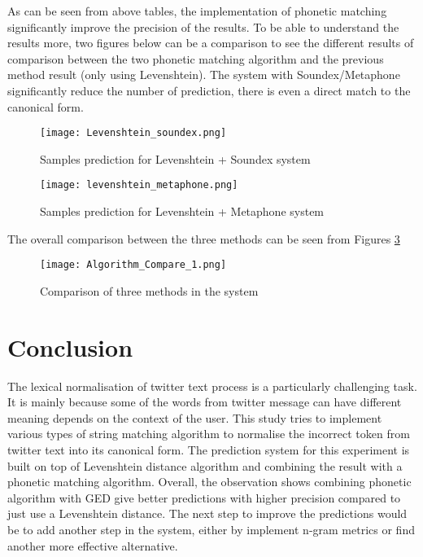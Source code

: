 \documentclass[11pt]{article}
\begin{document}
As can be seen from above tables, the implementation of phonetic matching significantly improve the precision of the results. To be able to understand the results more, two figures below can be a comparison to see the different results of comparison between the two phonetic matching algorithm and the previous method result (only using Levenshtein). The system with Soundex/Metaphone significantly reduce the number of prediction, there is even a direct match to the canonical form.

\begin{figure}[h!]
    \centering
    \texttt{[image: Levenshtein\_soundex.png]}
    \caption{Samples prediction for Levenshtein + Soundex system}
    \label{fig:2}
\end{figure}

\begin{figure}[h!]
    \centering
    \texttt{[image: levenshtein\_metaphone.png]}
    \caption{Samples prediction for Levenshtein + Metaphone system}
    \label{fig:3}
\end{figure}

The overall comparison between the three methods can be seen from Figures \ref{fig:4}

\begin{figure}[h!]
    \centering
    \texttt{[image: Algorithm\_Compare\_1.png]}
    \caption{Comparison of three methods in the system}
    \label{fig:4}
\end{figure}


\section{Conclusion}
The lexical normalisation of twitter text process is a particularly challenging task. It is mainly because some of the words from twitter message can have different meaning depends on the context of the user. This study tries to implement various types of string matching algorithm to normalise the incorrect token from twitter text into its canonical form. The prediction system for this experiment is built on top of Levenshtein distance algorithm and combining the result with a phonetic matching algorithm. Overall, the observation shows combining phonetic algorithm with GED give better predictions with higher precision compared to just use a Levenshtein distance. The next step to improve the predictions would be to add another step in the system, either by implement n-gram metrics or find another more effective alternative.

\printbibliography
\end{document}
